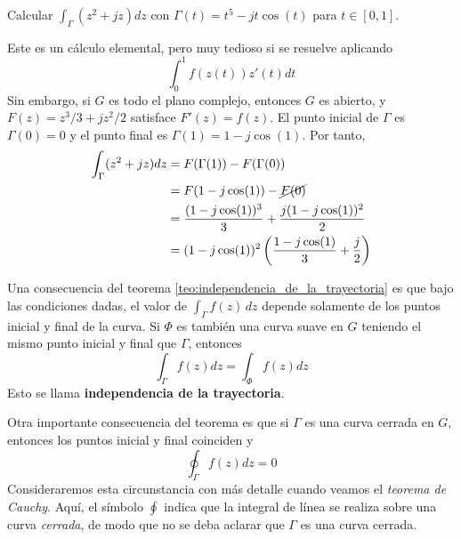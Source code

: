 \begin{example}
  Calcular $\int_\Gamma (z^2+jz)dz$ con $\Gamma(t)=t^5-jt\cos(t)$ para $t\in[0,1]$.

  Este es un cálculo elemental, pero muy tedioso si se resuelve aplicando 
  $$
  \int_0^1 f(z(t))z'(t)dt 
  $$
  Sin embargo, si $G$ es todo el plano complejo, entonces $G$ es abierto, y $F(z)=z^3/3 +jz^2/2$ satisface $F'(z)=f(z)$. El punto inicial de $\Gamma$ es $\Gamma(0)=0$ y el punto final es $\Gamma(1)=1-j\cos(1)$. Por tanto,
  \begin{align*}
    \int_\Gamma (z^2 +jz)dz &= F(\Gamma(1))-F(\Gamma(0)) \\ 
                            &= F(1-j\cos(1))-\cancel{F(0)} \\ 
                            &= \frac{(1-j\cos(1))^3}{3}+\frac{j(1-j\cos(1))^2}{2} \\ 
                            &= (1-j\cos(1))^2 \left( \frac{1-j\cos(1)}{3} + \frac{j}{2} \right)
  \end{align*}
\end{example}

Una consecuencia del teorema \ref{teo:independencia_de_la_trayectoria} es que bajo las condiciones dadas, el valor de $\int_\Gamma f(z)\,dz$ depende solamente de los puntos inicial y final de la curva. Si $\varPhi$ es también una curva suave en $G$ teniendo el mismo punto inicial y final que $\Gamma$, entonces
$$
\int_\Gamma f(z)dz = \int_\varPhi f(z)dz
$$
Esto se llama \textbf{independencia de la trayectoria}.

Otra importante consecuencia del teorema es que si $\Gamma$ es una curva cerrada en $G$, entonces los puntos inicial y final coinciden y
$$
\oint_\Gamma f(z)dz = 0
$$
Consideraremos esta circunstancia con más detalle cuando veamos el \textit{teorema de Cauchy}. Aquí, el símbolo $\oint$ indica que la integral de línea se realiza sobre una curva \textit{cerrada}, de modo que no se deba aclarar que $\Gamma$ es una curva cerrada.

